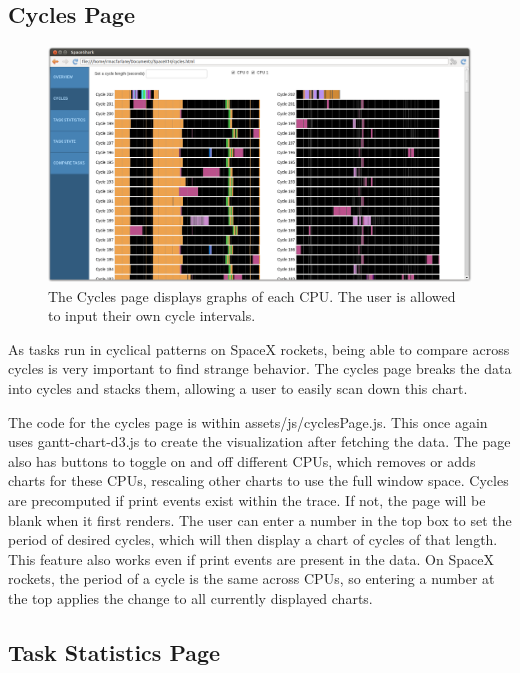\documentclass{hmcclinic}
\begin{document}
  \subsection{Cycles Page} %

  \begin{figure}[h!]
  \centering
      \includegraphics[width=5in]{cycles-page.png}
  \caption{The Cycles page displays graphs of each CPU. The user is allowed to input their own cycle intervals.}
  \end{figure}
  
  As tasks run in cyclical patterns on SpaceX rockets, being able to compare
  across cycles is very important to find strange behavior. The cycles page
  breaks the data into cycles and stacks them, allowing a user to easily scan
  down this chart.

    The code for the cycles page is within assets/js/cyclesPage.js. This once again
    uses gantt-chart-d3.js to create the visualization after fetching the data.
    The page also has buttons to toggle on and off different CPUs, which removes
    or adds charts for these CPUs, rescaling other charts to use the full window
    space. Cycles are precomputed if print events exist within the trace. If
    not, the page will be blank when it first renders. The user can enter a
    number in the top box to set the period of desired cycles, which will then
    display a chart of cycles of that length. This feature also works even if
    print events are present in the data. On SpaceX rockets, the period of a cycle 
    is the same across CPUs, so entering a number at the top applies the change
    to all currently displayed charts.
  
  \subsection{Task Statistics Page} %
\end{document}
